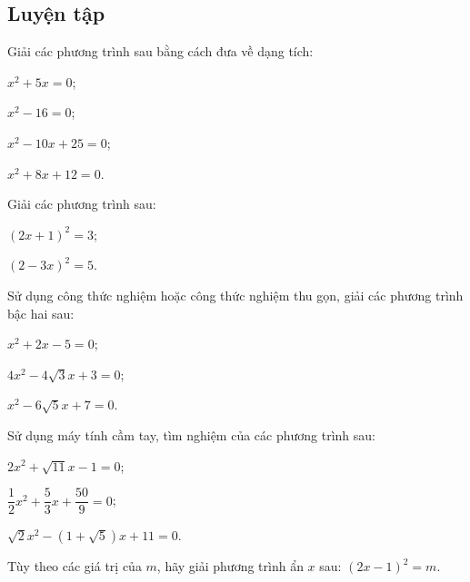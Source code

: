 \begin{practice}
    \subsection{Luyện tập}

    \begin{questions}[resume=SBT]
        \item Giải các phương trình sau bằng cách đưa về dạng tích:
        \begin{questions}
            \item $x^2+5x=0$;
            \item $x^2-16=0$;
            \item $x^2-10x+25=0$;
            \item $x^2+8x+12=0$.
        \end{questions}
        \answerline
        \answerline

        \item Giải các phương trình sau:
        \begin{questions}
            \item $(2x+1)^2=3$;
            \item $(2-3x)^2=5$.
        \end{questions}
        \answerline
        \answerline

        \item Sử dụng công thức nghiệm hoặc công thức nghiệm thu gọn, giải các phương trình bậc hai sau:
        \begin{questions}
            \item $x^2+2x-5=0$;
            \item $4x^2-4\sqrt{3}x+3=0$;
            \item $x^2-6\sqrt{5}x+7=0$.
        \end{questions}
        \answerline
        \answerline

        \item Sử dụng máy tính cầm tay, tìm nghiệm của các phương trình sau:
        \begin{questions}
            \item $2x^2+\sqrt{11}x-1=0$;
            \item $\dfrac{1}{2}x^2+\dfrac{5}{3}x+\dfrac{50}{9}=0$;
            \item $\sqrt{2}x^2-(1+\sqrt{5})x+11=0$.
        \end{questions}
        \answerline
        \answerline

        \item Tùy theo các giá trị của $m$, hãy giải phương trình ẩn $x$ sau: $(2x-1)^2=m$.


\end{questions}
\end{practice}
